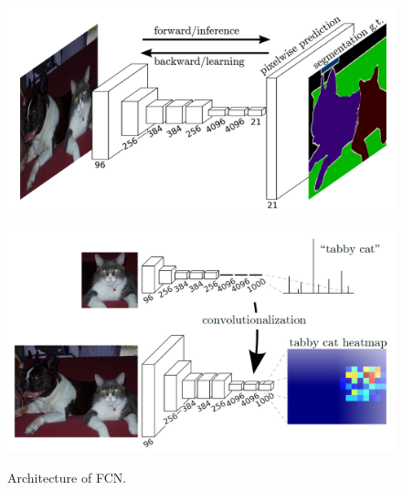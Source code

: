 \begin{figure}[H]
    \centering
    \begin{minipage}[t]{0.45\columnwidth}
        \centering
        \includegraphics[width=\linewidth]{figure/chapter2/FCN_architecture}
        \label{fig:FCNアーキテクチャ}
    \end{minipage}
    \begin{minipage}[t]{0.05\columnwidth}
        \hspace{5pt}
    \end{minipage}
    \begin{minipage}[t]{0.45\columnwidth}
        \centering
        \includegraphics[width=\linewidth]{figure/chapter2/FCN_output_heatmap}
        \label{fig:FCN最終層}
    \end{minipage}
    \caption{Architecture of FCN.}
    \label{fig:FCN概要}
\end{figure}


